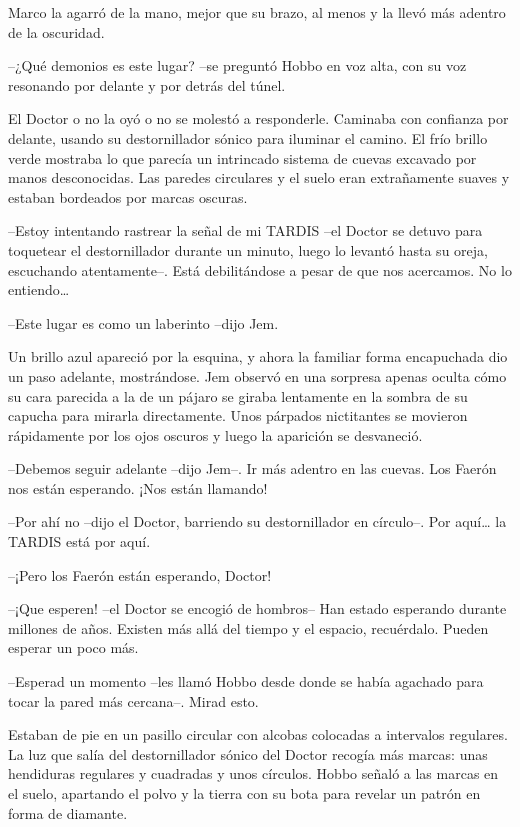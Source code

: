 {Marco la agarró de la mano, mejor que su brazo, al menos y la llevó más
 adentro de la oscuridad.}

{--¿Qué demonios es este lugar?
 --se preguntó Hobbo en voz alta, con su voz resonando por delante y por
detrás del túnel.}

{El Doctor o no la oyó o no se molestó a responderle. Caminaba con
 confianza por delante, usando su destornillador sónico para iluminar el
 camino. El frío brillo verde mostraba lo que parecía un intrincado
 sistema de cuevas excavado por manos desconocidas. Las paredes
 circulares y el suelo eran extrañamente suaves y estaban bordeados por
marcas oscuras.}

{--Estoy intentando rastrear la señal de mi TARDIS --el Doctor se detuvo
 para toquetear el destornillador durante un minuto, luego lo levantó
 hasta su oreja, escuchando atentamente--. Está debilitándose a pesar de
 que nos acercamos. No lo entiendo\ldots{}}

{--Este lugar es como un laberinto --dijo Jem.}

{Un brillo azul apareció por la esquina, y ahora la familiar forma
 encapuchada dio un paso adelante, mostrándose. Jem observó en una
 sorpresa apenas oculta cómo su cara parecida a la de un pájaro se giraba
 lentamente en la sombra de su capucha para mirarla directamente. Unos
 párpados nictitantes se movieron rápidamente por los ojos oscuros y
luego la aparición se desvaneció.}

{--Debemos seguir adelante --dijo Jem--. Ir más adentro en las cuevas.
Los Faerón nos están esperando. ¡Nos están llamando!}

{--Por ahí no --dijo el Doctor, barriendo su destornillador en círculo--.
 Por aquí\ldots{} la TARDIS está por aquí.}

{--¡Pero los Faerón están esperando, Doctor!}

{--¡Que esperen! --el Doctor se encogió de hombros-- Han estado esperando
 durante millones de años. Existen más allá del tiempo y el espacio,
recuérdalo. Pueden esperar un poco más.}

{--Esperad un momento --les llamó Hobbo desde donde se había agachado
para tocar la pared más cercana--. Mirad esto.}

{Estaban de pie en un pasillo circular con alcobas colocadas a intervalos
 regulares. La luz que salía del destornillador sónico del Doctor recogía
 más marcas: unas hendiduras regulares y cuadradas y unos círculos. Hobbo
 señaló a las marcas en el suelo, apartando el polvo y la tierra con su
bota para revelar un patrón en forma de diamante.}

